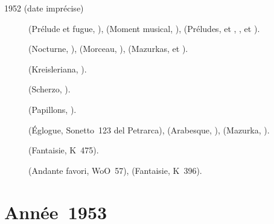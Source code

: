 \begin{description}
 \item[1952 (date imprécise)]
 \Glazounov{} (Prélude et fugue,  ), \Rachmaninov{}
 (Moment musical,  ), \Scriabine{} (Préludes, 
  et ,  ,  et ).
 \item[]
 \Chopin{} (Nocturne,  ), \Glazounov{} (Morceau,
  ), \Scriabine{} (Mazurkas,   et
 ).
 \item[]
 \Schumann{} (Kreisleriana, ).
 \item[]
 \Chopin{} (Scherzo, ).
 \item[]
 \Schumann{} (Papillons, ).
 \item[]
 \Liszt{} (Églogue, Sonetto~123 del Petrarca), \Schumann{} (Arabesque,
 ), \Scriabine{} (Mazurka,  ).
 \item[]
 \Mozart{} (Fantaisie, K~475).
 \item[]
 \Beethoven{} (Andante favori, WoO~57), \Mozart{} (Fantaisie, K~396).
\end{description}

\section{Année~1953}

